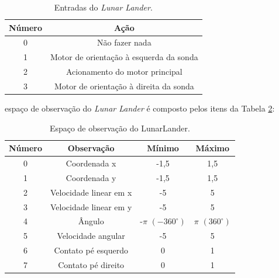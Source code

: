 \documentclass[12pt,           %
a4paper,                       %
openany,                       %
oneside,                       %
chapter=TITLE,                 %
english,                       %
spanish,                       %
brazil,                        %
sumario=tradicional]{abntex2}  %
\begin{document}
\begin{OnehalfSpace}
\begin{table}[H]
	\centering
	\vspace*{-0.2cm}
	\caption{Entradas do \textit{Lunar Lander}.}
        \begin{tabular}{|c|c|}
            \hline
            Número & Ação  \\
            \hline
            0 & Não fazer nada \\
            \hline
            1 & Motor de orientação à esquerda da sonda \\
            \hline
            2 & Acionamento do motor principal\\
            \hline
            3 & Motor de orientação à direita da sonda \\
            \hline
            \end{tabular} 
        \label{tab:intlunarlander}                 %
    \end{table}
\vspace*{-.655cm}
{\raggedright {}}

\noindent espaço de observação do \textit{Lunar Lander} é composto pelos itens da Tabela \ref{tab:outlunarlander}:

\begin{table}[H]
	\centering
	\vspace*{-0.2cm}
	\caption{Espaço de observação do LunarLander.}
        \begin{tabular}{|c|c|c|c|}
            \hline
            Número & Observação & Mínimo & Máximo  \\
            \hline
            0 & Coordenada x & -1,5 & 1,5\\
            \hline
            1 & Coordenada y & -1,5 & 1,5\\
            \hline
            2 & Velocidade linear em x &  -5 & 5\\
            \hline
            3 & Velocidade linear em y &  -5 & 5\\
            \hline
            4 & Ângulo & -$\pi$  $(-360^\circ)$ & $\pi$ $(360^\circ)$\\
            \hline
            5 & Velocidade angular &  -5 & 5\\
            \hline
            6 & Contato pé esquerdo &  0 & 1\\
            \hline
            7 & Contato pé direito &  0 & 1\\
        \hline
        \end{tabular}
        \label{tab:outlunarlander}                 %
    \end{table}
\vspace*{-.655cm}
{\raggedright {}}



\end{OnehalfSpace}
\end{document}
